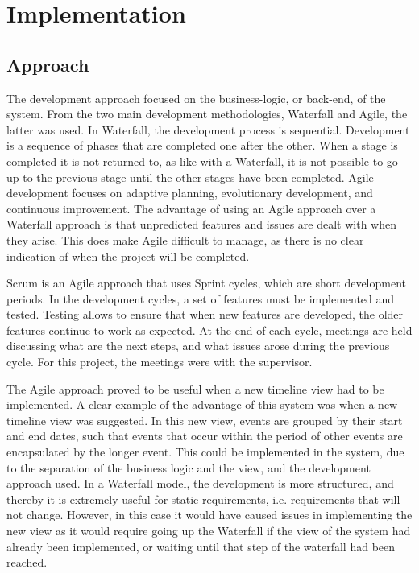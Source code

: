 \chapter{Implementation}
\section{Approach}
\par The development approach focused on the business-logic, or back-end, of the system. From the two main development methodologies, Waterfall and Agile, the latter was used. In Waterfall, the development process is sequential. Development is a sequence of phases that are completed one after the other. When a stage is completed it is not returned to, as like with a Waterfall, it is not possible to go up to the previous stage until the other stages have been completed. Agile development focuses on adaptive planning, evolutionary development, and continuous improvement. The advantage of using an Agile approach over a Waterfall approach is that unpredicted features and issues are dealt with when they arise. This does make Agile difficult to manage, as there is no clear indication of when the project will be completed.
 
\par Scrum is an Agile approach that uses Sprint cycles, which are short development periods. In the development cycles, a set of features must be implemented and tested. Testing allows to ensure that when new features are developed, the older features continue to work as expected. At the end of each cycle, meetings are held discussing what are the next steps, and what issues arose during the previous cycle. For this project, the meetings were with the supervisor.
 
\par The Agile approach proved to be useful when a new timeline view had to be implemented. A clear example of the advantage of this system was when a new timeline view was suggested. In this new view, events are grouped by their start and end dates, such that events that occur within the period of other events are encapsulated by the longer event. This could be implemented in the system, due to the separation of the business logic and the view, and the development approach used. In a Waterfall model, the development is more structured, and thereby it is extremely useful for static requirements, i.e. requirements that will not change. However, in this case it would have caused issues in implementing the new view as it would require going up the Waterfall if the view of the system had already been implemented, or waiting until that step of the waterfall had been reached.

